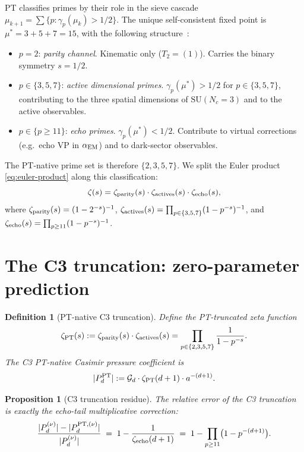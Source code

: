 \documentclass[11pt,a4paper]{article}
\newtheorem{proposition}{Proposition}
\newtheorem{definition}{Definition}
\newcommand{\actives}{\{3,5,7\}}
\newcommand{\PTset}{\{2,3,5,7\}}
\newcommand{\echoes}{\{p \geq 11\}}
\begin{document}
PT classifies primes by their role in the sieve cascade
$\mu_{k+1} = \sum \{p : \gamma_{p}(\mu_{k}) > 1/2 \}$. The unique self-consistent fixed point
is $\mu^{*} = 3 + 5 + 7 = 15$, with the following structure~\cite{Senez2026}:

\begin{itemize}
  \item $p = 2$: \emph{parity channel}. Kinematic only ($T_{2} = (1)$). Carries the binary
  symmetry $s = 1/2$.
  \item $p \in \actives$: \emph{active dimensional primes}. $\gamma_{p}(\mu^{*}) > 1/2$ for
  $p \in \actives$, contributing to the three spatial dimensions of $\mathrm{SU}(N_{c}=3)$ and
  to the active observables.
  \item $p \in \echoes$: \emph{echo primes}. $\gamma_{p}(\mu^{*}) < 1/2$. Contribute to
  virtual corrections (e.g.\ echo VP in $\alpha_{\rm EM}$) and to dark-sector observables.
\end{itemize}

The PT-native prime set is therefore $\PTset$. We split the Euler product
\eqref{eq:euler-product} along this classification:
\begin{equation}
\zeta(s) = \zeta_{\rm parity}(s) \cdot \zeta_{\rm actives}(s) \cdot \zeta_{\rm echo}(s),
\label{eq:pt-split}
\end{equation}
where $\zeta_{\rm parity}(s) = (1 - 2^{-s})^{-1}$,
$\zeta_{\rm actives}(s) = \prod_{p \in \actives}(1-p^{-s})^{-1}$, and
$\zeta_{\rm echo}(s) = \prod_{p \geq 11}(1-p^{-s})^{-1}$.

\section{The C3 truncation: zero-parameter prediction}
\label{sec:c3}

\begin{definition}[PT-native C3 truncation]
Define the PT-truncated zeta function
\begin{equation}
\zeta_{\rm PT}(s) := \zeta_{\rm parity}(s) \cdot \zeta_{\rm actives}(s)
                   = \prod_{p \in \PTset}\frac{1}{1 - p^{-s}}.
\end{equation}
The C3 PT-native Casimir pressure coefficient is
\begin{equation}
|P_{d}^{\rm PT}| := \mathcal{G}_{d} \cdot \zeta_{\rm PT}(d+1) \cdot a^{-(d+1)}.
\end{equation}
\end{definition}

\begin{proposition}[C3 truncation residue]
\label{prop:c3-residue}
The relative error of the C3 truncation is exactly the echo-tail multiplicative correction:
\begin{equation}
\frac{|P_{d}^{(\nu)}| - |P_{d}^{{\rm PT},(\nu)}|}{|P_{d}^{(\nu)}|}
\;=\; 1 - \frac{1}{\zeta_{\rm echo}(d+1)}
\;=\; 1 - \prod_{p \geq 11}\bigl(1 - p^{-(d+1)}\bigr).
\label{eq:c3-residue}
\end{equation}
\end{proposition}
\end{document}
